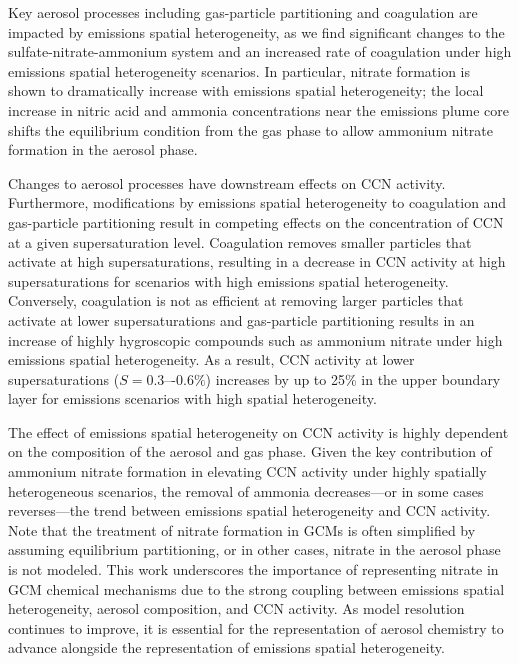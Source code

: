 \documentclass[journal abbreviation, manuscript]{copernicus}
\begin{document}
Key aerosol processes including gas-particle partitioning and coagulation are impacted by emissions spatial heterogeneity, as we find significant changes to the sulfate-nitrate-ammonium system and an increased rate of coagulation under high emissions spatial heterogeneity scenarios. In particular, nitrate formation is shown to dramatically increase with emissions spatial heterogeneity; the local increase in nitric acid and ammonia concentrations near the emissions plume core shifts the equilibrium condition from the gas phase to allow ammonium nitrate formation in the aerosol phase. 

Changes to aerosol processes have downstream effects on CCN activity. Furthermore, modifications by emissions spatial heterogeneity to coagulation and gas-particle partitioning result in competing effects on the concentration of CCN at a given supersaturation level. Coagulation removes smaller particles that activate at high supersaturations, resulting in a decrease in CCN activity at high supersaturations for scenarios with high emissions spatial heterogeneity. Conversely, coagulation is not as efficient at removing larger particles that activate at lower supersaturations and gas-particle partitioning results in an increase of highly hygroscopic compounds such as ammonium nitrate under high emissions spatial heterogeneity. As a result, CCN activity at lower supersaturations ($S = 0.3\mbox{–-}0.6\%$) increases by up to 25\% in the upper boundary layer for emissions scenarios with high spatial heterogeneity.

The effect of emissions spatial heterogeneity on CCN activity is highly dependent on the composition of the aerosol and gas phase. Given the key contribution of ammonium nitrate formation in elevating CCN activity under highly spatially heterogeneous scenarios, the removal of ammonia decreases---or in some cases reverses---the trend between emissions spatial heterogeneity and CCN activity. Note that the treatment of nitrate formation in GCMs is often simplified by assuming equilibrium partitioning, or in other cases, nitrate in the aerosol phase is not modeled. This work underscores the importance of representing nitrate in GCM chemical mechanisms due to the strong coupling between emissions spatial heterogeneity, aerosol composition, and CCN activity. As model resolution continues to improve, it is essential for the representation of aerosol chemistry to advance alongside the representation of emissions spatial heterogeneity. 

\end{document}
